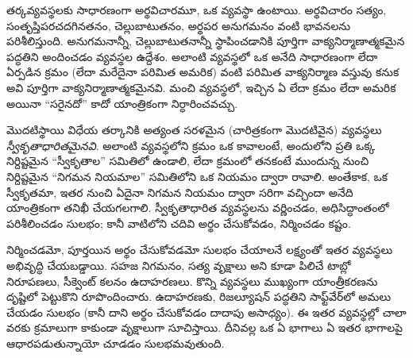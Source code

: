 \documentclass[../../../include/open-logic-section]{subfiles}
\begin{document}
      {}
      {}


తర్కవ్యవస్థలకు సాధారణంగా అర్థవిచారమూ, ఒక 
వ్యవస్థా ఉంటాయి. అర్థవిచారం సత్యం, సంతృప్తిపరచదగినతనం,
చెల్లుబాటుతనం, అర్థపర అనుగమనం వంటి భావనలను పరిశీలిస్తుంది.
అనుగమనాన్నీ, చెల్లుబాటుతనాన్నీ స్థాపించడానికి పూర్తిగా
వాక్యనిర్మాణాత్మకమైన పద్ధతిని అందించడం  వ్యవస్థల
ఉద్దేశం. అలాంటి వ్యవస్థలో ఒక  అనేది సాధారణంగా
 లేదా  ఏర్పడిన క్రమం (లేదా మరేదైనా
పరిమిత అమరిక) వంటి పరిమిత వాక్యనిర్మాణ వస్తువు కనుక అవి పూర్తిగా
వాక్యనిర్మాణాత్మకమైనవి. మంచి  వ్యవస్థలో, ఇచ్చిన ఏ
 లేదా  క్రమం లేదా అమరిక అయినా “సరైనదో”
కాదో యాంత్రికంగా నిర్ధారించవచ్చు.

మొదటిస్థాయి విధేయ తర్కానికి అత్యంత సరళమైన (చారిత్రకంగా మొదటివైన)
 వ్యవస్థలు
\emph{స్వీకృతాధారితమైనవి}. అలాంటి వ్యవస్థలోని  క్రమం
ఒక  కావాలంటే, అందులోని ప్రతి ఒక్క 
నిర్దిష్టమైన “స్వీకృతాల” సమితిలో ఉండాలి, లేదా క్రమంలో తనకంటే ముందున్న
 నుంచి నిర్దిష్టమైన “నిగమన నియమాల” సమితిలోని ఒక నియమం
ద్వారా రావాలి. అంతేకాక, ఒక  స్వీకృతమా, ఇతర
 నుంచి ఏదైనా నిగమన నియమం ద్వారా సరిగా వచ్చిందా అనేది
యాంత్రికంగా తనిఖీ చేయగలగాలి. స్వీకృతాధారిత  వ్యవస్థలను
వర్ణించడం, అధిసిద్ధాంతంలో పరిశీలించడం సులభం; కానీ వాటిలోని
 చదివి అర్థం చేసుకోవడం, నిర్మించడం కష్టం.

 నిర్మించడమో, పూర్తయిన  అర్థం చేసుకోవడమో
సులభం చేయాలనే లక్ష్యంతో ఇతర  వ్యవస్థలు అభివృద్ధి
చేయబడ్డాయి. సహజ నిగమనం, సత్య వృక్షాలు అని కూడా పిలిచే టాబ్లో
నిరూపణలు, సీక్వెంట్ కలనం ఉదాహరణలు. కొన్ని  వ్యవస్థలు
ముఖ్యంగా యాంత్రీకరణను దృష్టిలో పెట్టుకొని రూపొందించారు.
ఉదాహరణకు, రిజల్యూషన్ పద్ధతిని సాఫ్ట్‌వేర్‌లో అమలు చేయడం సులభం
(కానీ దాని  అర్థం చేసుకోవడం దాదాపు అసాధ్యం). ఈ
ఇతర  వ్యవస్థల్లో చాలా వరకు  క్రమాలుగా
కాకుండా  వృక్షాలుగా సూచిస్తాయి. దీనివల్ల ఒక
 ఏ భాగాలు ఏ ఇతర భాగాలపై ఆధారపడుతున్నాయో చూడడం
సులభమవుతుంది.
\end{document}
